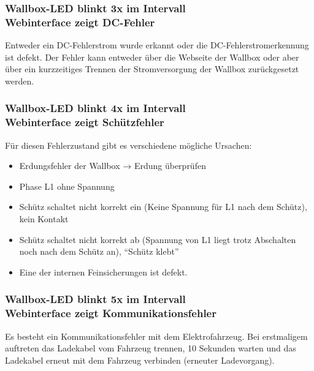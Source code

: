 \documentclass[a4paper,10pt]{article}
\begin{document}
\begin{multicols*}{2}
	\begin{minipage}{\linewidth} %
		\subsubsection*{Wallbox-LED blinkt 3x im Intervall \\ Webinterface zeigt DC-Fehler}
		Entweder ein DC-Fehlerstrom wurde erkannt oder die DC-Fehlerstromerkennung ist defekt.
		Der Fehler kann entweder über die Webseite der Wallbox oder aber über
		ein kurzzeitiges Trennen der Stromversorgung der Wallbox zurückgesetzt
		werden.
	\end{minipage}

	\subsubsection*{Wallbox-LED blinkt 4x im Intervall \\ Webinterface zeigt Schützfehler}
	Für diesen Fehlerzustand gibt es verschiedene mögliche Ursachen:
	\begin{itemize}
		\item Erdungsfehler der Wallbox → Erdung überprüfen
		\item Phase L1 ohne Spannung
		\item Schütz schaltet nicht korrekt ein (Keine Spannung für L1 nach dem Schütz), kein
		      Kontakt
		\item Schütz schaltet nicht korrekt ab (Spannung von L1 liegt trotz Abschalten noch
		      nach dem Schütz an), \enquote{Schütz klebt}
		\item Eine der internen Feinsicherungen ist defekt.
	\end{itemize}

	\subsubsection*{Wallbox-LED blinkt 5x im Intervall \\ Webinterface zeigt Kommunikationsfehler}
	Es besteht ein Kommunikationsfehler mit dem Elektrofahrzeug. Bei erstmaligem
	auftreten das Ladekabel vom Fahrzeug trennen, 10 Sekunden warten und das
	Ladekabel erneut mit dem Fahrzeug verbinden (erneuter Ladevorgang).


\end{multicols*}
\end{document}

